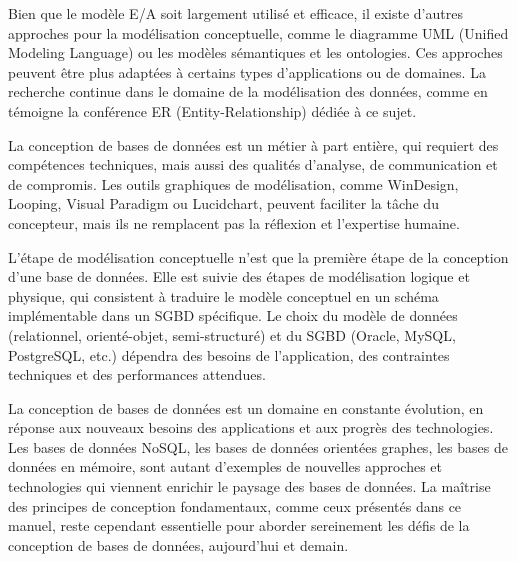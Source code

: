 \documentclass{article}
\begin{document}
Bien que le modèle E/A soit largement utilisé et efficace, il existe d'autres approches pour la modélisation conceptuelle, comme le diagramme UML (Unified Modeling Language) ou les modèles sémantiques et les ontologies.  Ces approches peuvent être plus adaptées à certains types d'applications ou de domaines.  La recherche continue dans le domaine de la modélisation des données, comme en témoigne la conférence ER (Entity-Relationship) dédiée à ce sujet.

La conception de bases de données est un métier à part entière, qui requiert des compétences techniques, mais aussi des qualités d'analyse, de communication et de compromis.  Les outils graphiques de modélisation, comme WinDesign, Looping, Visual Paradigm ou Lucidchart, peuvent faciliter la tâche du concepteur, mais ils ne remplacent pas la réflexion et l'expertise humaine.

L'étape de modélisation conceptuelle n'est que la première étape de la conception d'une base de données.  Elle est suivie des étapes de modélisation logique et physique, qui consistent à traduire le modèle conceptuel en un schéma implémentable dans un SGBD spécifique.  Le choix du modèle de données (relationnel, orienté-objet, semi-structuré) et du SGBD (Oracle, MySQL, PostgreSQL, etc.) dépendra des besoins de l'application, des contraintes techniques et des performances attendues.

La conception de bases de données est un domaine en constante évolution, en réponse aux nouveaux besoins des applications et aux progrès des technologies.  Les bases de données NoSQL, les bases de données orientées graphes, les bases de données en mémoire, sont autant d'exemples de nouvelles approches et technologies qui viennent enrichir le paysage des bases de données.  La maîtrise des principes de conception fondamentaux, comme ceux présentés dans ce manuel, reste cependant essentielle pour aborder sereinement les défis de la conception de bases de données, aujourd'hui et demain.
\end{document}
